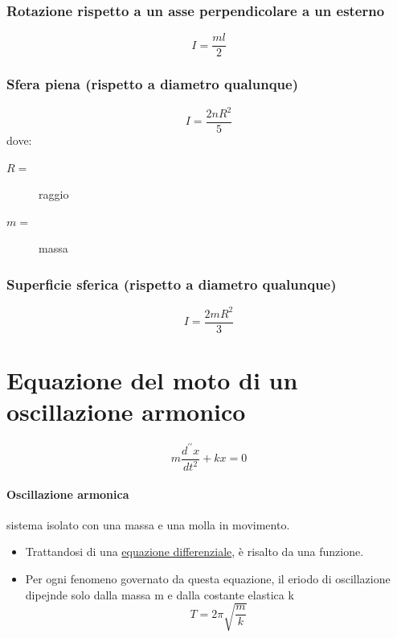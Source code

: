 \documentclass{book}
\begin{document}
\begin{multicols}{2}
  \subsubsection{Rotazione rispetto a un asse perpendicolare a un esterno}
  \label{sec:rotrispaunasperpaunestern}
  \begin{equation}
    \label{eq:rotrispaunasperpaunestern}
    I=\frac{ml}{2}
  \end{equation}
  
  \subsubsection{Sfera piena (rispetto a diametro qualunque)}
  \label{sec:sferapiena}
  \begin{equation}
    \label{eq:sperapiena}
    I=\frac{2nR^2}{5}
  \end{equation}
  dove:
  \begin{description}
  \item[$R=$] raggio
  \item[$m=$] massa
  \end{description}
  
  \subsubsection{Superficie sferica (rispetto a diametro qualunque)}
  \label{sec:supersferica}
  \begin{equation}
    \label{eq:supersferica}
    I=\frac{2mR^2}{3}
  \end{equation}
\end{multicols}

\section{Equazione del moto di un oscillazione armonico}
\label{sec:eqdelmotodiunoscarm}

\begin{equation}
  \label{eq:eqdelmotodiunscarm}
  m\frac{d^{\prime\prime}x}{dt^2}+kx=0
\end{equation}

\paragraph{Oscillazione armonica}

sistema isolato con una massa e una molla in movimento.
\begin{itemize}
\item Trattandosi di una \underline{equazione differenziale}, è risalto da una funzione.
\item Per ogni fenomeno governato da questa equazione, il eriodo di oscillazione dipejnde solo dalla massa m e dalla costante elastica k
  \begin{equation*}
    T=2\pi\sqrt{\frac{m}{k}}
  \end{equation*}
\end{itemize}
\end{document}
